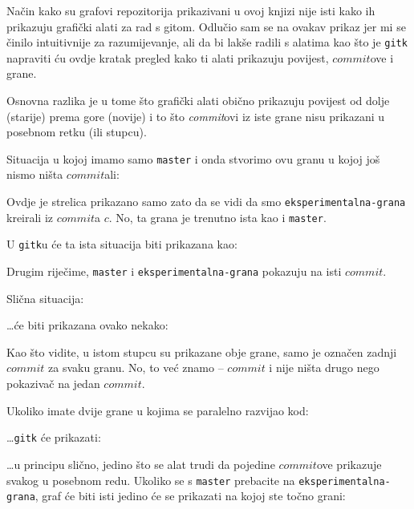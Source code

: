 
Način kako su grafovi repozitorija prikazivani u ovoj knjizi nije isti kako ih prikazuju grafički alati za rad s gitom.
Odlučio sam se na ovakav prikaz jer mi se činilo intuitivnije za razumijevanje, ali da bi lakše radili s alatima kao što je \verb+gitk+ napraviti ću ovdje kratak pregled kako ti alati prikazuju povijest, $commit$ove i grane.

Osnovna razlika je u tome što grafički alati obično prikazuju povijest od dolje (starije) prema gore (novije)
i to što \emph{commit}ovi iz iste grane nisu prikazani u posebnom retku (ili stupcu).


Situacija u kojoj imamo samo \verb+master+ i onda stvorimo ovu granu u kojoj još nismo ništa $commit$ali:



Ovdje je strelica prikazano samo zato da se vidi da smo \verb+eksperimentalna-grana+ kreirali iz $commit$a $c$.
No, ta grana je trenutno ista kao i \verb+master+.

U \verb+gitk+u će ta ista situacija biti prikazana kao:


Drugim riječime, \verb+master+ i \verb+eksperimentalna-grana+ pokazuju na isti $commit$.

Slična situacija:



\dots{}će biti prikazana ovako nekako:


Kao što vidite, u istom stupcu su prikazane obje grane, samo je označen zadnji $commit$ za svaku granu.
No, to već znamo -- $commit$ i nije ništa drugo nego pokazivač na jedan $commit$.

Ukoliko imate dvije grane u kojima se paralelno razvijao kod:



\dots{}\verb+gitk+ će prikazati:


\dots{}u principu slično, jedino što se alat trudi da pojedine $commit$ove prikazuje svakog u posebnom redu.
Ukoliko se s \verb+master+ prebacite na \verb+eksperimentalna-grana+, graf će biti isti jedino će se prikazati na kojoj ste točno grani:

